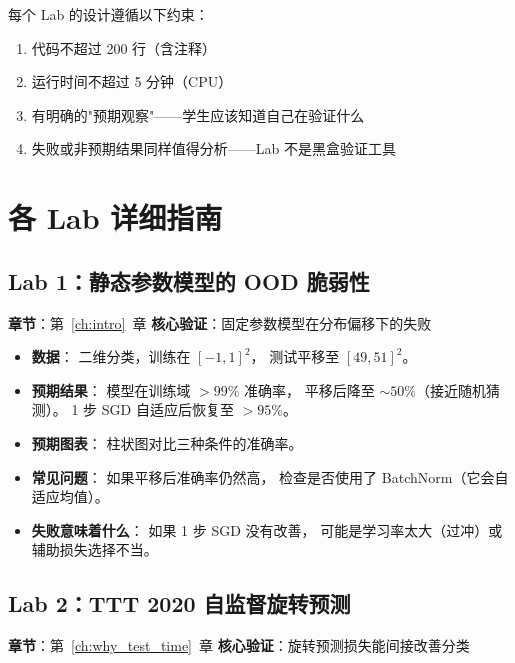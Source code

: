 每个 Lab 的设计遵循以下约束：
\begin{enumerate}
  \item 代码不超过 200 行（含注释）
  \item 运行时间不超过 5 分钟（CPU）
  \item 有明确的"预期观察"——学生应该知道自己在验证什么
  \item 失败或非预期结果同样值得分析——Lab 不是黑盒验证工具
\end{enumerate}

\section{各 Lab 详细指南}

\subsection{Lab 1：静态参数模型的 OOD 脆弱性}

\textbf{章节}：第~\ref{ch:intro}~章 \quad
\textbf{核心验证}：固定参数模型在分布偏移下的失败

\begin{itemize}
  \item \textbf{数据}：
    二维分类，训练在 $[-1, 1]^2$，
    测试平移至 $[49, 51]^2$。

  \item \textbf{预期结果}：
    模型在训练域 $>99\%$ 准确率，
    平移后降至 $\sim 50\%$（接近随机猜测）。
    1 步 SGD 自适应后恢复至 $>95\%$。

  \item \textbf{预期图表}：
    柱状图对比三种条件的准确率。

  \item \textbf{常见问题}：
    如果平移后准确率仍然高，
    检查是否使用了 BatchNorm（它会自适应均值）。

  \item \textbf{失败意味着什么}：
    如果 1 步 SGD 没有改善，
    可能是学习率太大（过冲）或辅助损失选择不当。
\end{itemize}

\subsection{Lab 2：TTT 2020 自监督旋转预测}

\textbf{章节}：第~\ref{ch:why_test_time}~章 \quad
\textbf{核心验证}：旋转预测损失能间接改善分类

